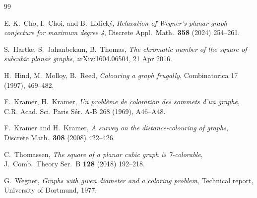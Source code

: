 \documentclass[11pt]{article}
\begin{document}
\begin{thebibliography}{99}



 
  E.-K.~Cho, I.~Choi, and B.~Lidick\'{y},
{\em Relaxation of Wegner's planar graph conjecture for maximum degree 4},
Discrete Appl.\ Math.\ {\bf 358} (2024) 254--261.




 S.~Hartke, S.~Jahanbekam, B.~Thomas, {\em The chromatic number of the square of subcubic planar graphs}, arXiv:1604.06504, 21 Apr 2016. 

H.~Hind, M.~Molloy, B.~Reed, 
{\em Colouring a graph frugally},
Combinatorica 17 (1997), 469--482.

 F.~Kramer, H.~Kramer, {\em Un probl\`{e}me de coloration des sommets d'un graphe},  C.R. Acad. Sci. Paris S\' er. A-B 268 (1969), A46--A48.


   F.~Kramer and H.~Kramer,
    {\em A    survey on the distance-colouring of graphs},
    Discrete Math.\ {\bf 308} (2008) 422--426.

 C.~Thomassen, {\em The square of a planar cubic graph is 7-colorable}, J.\ Comb.\ Theory Ser.\ B {\bf 128} (2018) 192--218.

 G.~Wegner, {\em Graphs with given diameter and a coloring problem}, Technical report, University of Dortmund, 1977. 


\end{thebibliography}
\end{document}

